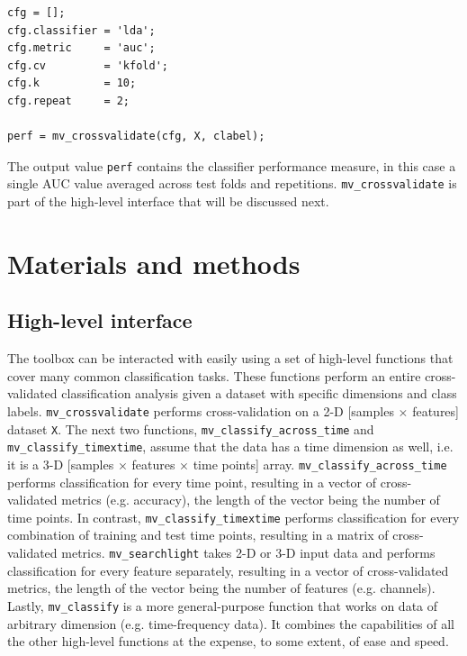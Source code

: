 \documentclass[utf8]{frontiersSCNS} %
\newcommand{\ttt}[1]{\texttt{#1}}
\begin{document}
\begin{verbatim}
cfg = [];
cfg.classifier = 'lda';
cfg.metric     = 'auc';
cfg.cv         = 'kfold';
cfg.k          = 10;
cfg.repeat     = 2;

perf = mv_crossvalidate(cfg, X, clabel);
\end{verbatim}

The output value \ttt{perf} contains the classifier performance measure, in this case a single AUC value averaged across test folds and repetitions. \ttt{mv\_crossvalidate} is part of the high-level interface that will be discussed next.

\section{Materials and methods}

\subsection{High-level interface}


The toolbox can be interacted with easily using a set of high-level functions that cover many common classification tasks. These functions perform an entire cross-validated classification analysis given a dataset with specific dimensions and class labels. \ttt{mv\_crossvalidate} performs  cross-validation on a 2-D [samples $\times$ features] dataset \ttt{X}. The next two functions, \ttt{mv\_classify\_across\_time}  and \ttt{mv\_classify\_timextime}, assume that the data has a time dimension as well, i.e. it is a 3-D [samples $\times$ features $\times$ time points] array. \ttt{mv\_classify\_across\_time} performs classification for every time point, resulting in a vector of cross-validated metrics (e.g. accuracy), the length of the vector being the number of time points. In contrast, \ttt{mv\_classify\_timextime} performs  classification for every combination of training and test time points, resulting in a matrix of cross-validated metrics. \ttt{mv\_searchlight} takes 2-D or 3-D input data and performs classification for every feature separately, resulting in a vector of cross-validated metrics, the length of the vector being the number of features (e.g. channels). Lastly, \ttt{mv\_classify} is a more general-purpose function that works on data of arbitrary dimension (e.g. time-frequency data). It combines the capabilities of all the other high-level functions at the expense, to some extent, of ease and speed.
\end{document}
